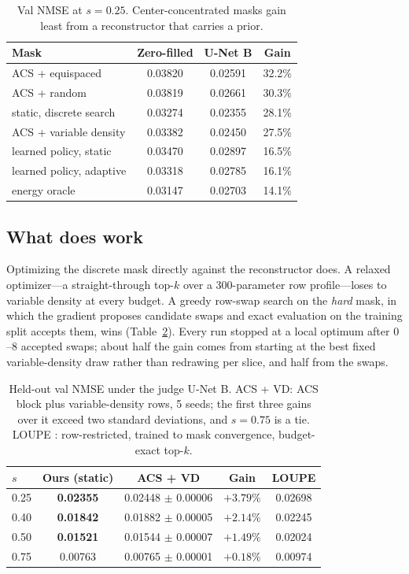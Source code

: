\documentclass{article}
\begin{document}
\begin{table}[t]
\centering
\caption{Val NMSE at $s = 0.25$. Center-concentrated masks gain least from a reconstructor that carries a prior.}
\label{tab:recon-gain}
\small
\begin{tabular}{lccc}
\hline
\textbf{Mask} & \textbf{Zero-filled} & \textbf{U-Net B} & \textbf{Gain} \\
\hline
ACS + equispaced & 0.03820 & 0.02591 & 32.2\% \\
ACS + random & 0.03819 & 0.02661 & 30.3\% \\
static, discrete search & 0.03274 & 0.02355 & 28.1\% \\
ACS + variable density & 0.03382 & 0.02450 & 27.5\% \\
learned policy, static & 0.03470 & 0.02897 & 16.5\% \\
learned policy, adaptive & 0.03318 & 0.02785 & 16.1\% \\
energy oracle & 0.03147 & 0.02703 & 14.1\% \\
\hline
\end{tabular}
\end{table}

\subsection{What does work}
Optimizing the discrete mask directly against the reconstructor does. A relaxed optimizer---a straight-through top-$k$ over a 300-parameter row profile---loses to variable density at every budget. A greedy row-swap search on the \emph{hard} mask, in which the gradient proposes candidate swaps and exact evaluation on the training split accepts them, wins (Table~\ref{tab:mri-main}). Every run stopped at a local optimum after $0$--$8$ accepted swaps; about half the gain comes from starting at the best fixed variable-density draw rather than redrawing per slice, and half from the swaps.

\begin{table}[t]
\centering
\caption{Held-out val NMSE under the judge U-Net B. ACS + VD: ACS block plus variable-density rows, 5 seeds; the first three gains over it exceed two standard deviations, and $s = 0.75$ is a tie. LOUPE \citep{bahadir2020loupe}: row-restricted, trained to mask convergence, budget-exact top-$k$.}
\label{tab:mri-main}
\small
\setlength{\tabcolsep}{4pt}
\begin{tabular}{lcccc}
\hline
$s$ & \textbf{Ours (static)} & \textbf{ACS + VD} & \textbf{Gain} & \textbf{LOUPE} \\
\hline
0.25 & \textbf{0.02355} & 0.02448 $\pm$ 0.00006 & $+3.79\%$ & 0.02698 \\
0.40 & \textbf{0.01842} & 0.01882 $\pm$ 0.00005 & $+2.14\%$ & 0.02245 \\
0.50 & \textbf{0.01521} & 0.01544 $\pm$ 0.00007 & $+1.49\%$ & 0.02024 \\
0.75 & 0.00763 & 0.00765 $\pm$ 0.00001 & $+0.18\%$ & 0.00974 \\
\hline
\end{tabular}
\end{table}
\end{document}
